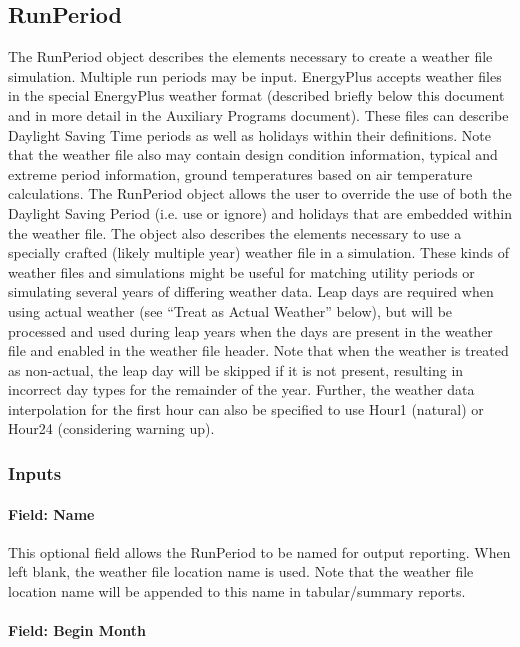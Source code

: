 \subsection{RunPeriod}\label{runperiod}

The RunPeriod object describes the elements necessary to create a weather file simulation. Multiple run
periods may be input. EnergyPlus accepts weather files in the special EnergyPlus weather format
(described briefly below this document and in more detail in the Auxiliary Programs document). These files
can describe Daylight Saving Time periods as well as holidays within their definitions. Note that the weather
file also may contain design condition information, typical and extreme period information, ground
temperatures based on air temperature calculations. The RunPeriod object allows the user to override the use
of both the Daylight Saving Period (i.e. use or ignore) and holidays that are embedded within the weather
file. The object also describes the elements necessary to use a specially crafted (likely multiple year)
weather file in a simulation. These kinds of weather files and simulations might be useful for matching
utility periods or simulating several years of differing weather data. Leap days are required when using
actual weather (see ``Treat as Actual Weather'' below), but will be processed and used during leap years
when the days are present in the weather file and enabled in the weather file header. Note that when the
weather is treated as non-actual, the leap day will be skipped if it is not present, resulting in incorrect
day types for the remainder of the year. Further, the weather data interpolation for the first hour can also be specified to use Hour1 (natural) or Hour24 (considering warning up).

\subsubsection{Inputs}\label{inputs-5-016}

\paragraph{Field: Name}\label{field-name-5-012}

This optional field allows the RunPeriod to be named for output reporting. When left blank, the weather file
location name is used. Note that the weather file location name will be appended to this name in
tabular/summary reports.

\paragraph{Field: Begin Month}\label{field-begin-month-2}

